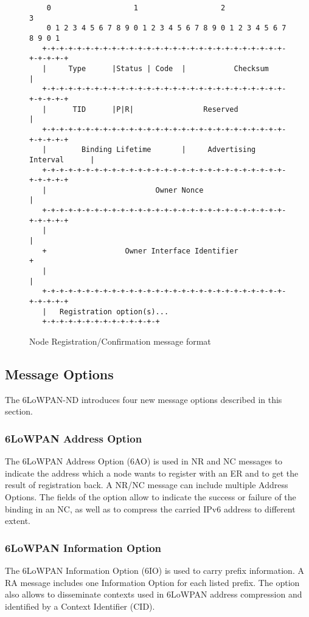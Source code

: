 \begin{figure}[htp]
\begin{mylisting}
\begin{verbatim}
    0                   1                   2                   3
    0 1 2 3 4 5 6 7 8 9 0 1 2 3 4 5 6 7 8 9 0 1 2 3 4 5 6 7 8 9 0 1
   +-+-+-+-+-+-+-+-+-+-+-+-+-+-+-+-+-+-+-+-+-+-+-+-+-+-+-+-+-+-+-+-+
   |     Type      |Status | Code  |           Checksum            |
   +-+-+-+-+-+-+-+-+-+-+-+-+-+-+-+-+-+-+-+-+-+-+-+-+-+-+-+-+-+-+-+-+
   |      TID      |P|R|                Reserved                   |
   +-+-+-+-+-+-+-+-+-+-+-+-+-+-+-+-+-+-+-+-+-+-+-+-+-+-+-+-+-+-+-+-+
   |        Binding Lifetime       |     Advertising Interval      |
   +-+-+-+-+-+-+-+-+-+-+-+-+-+-+-+-+-+-+-+-+-+-+-+-+-+-+-+-+-+-+-+-+
   |                         Owner Nonce                           |
   +-+-+-+-+-+-+-+-+-+-+-+-+-+-+-+-+-+-+-+-+-+-+-+-+-+-+-+-+-+-+-+-+
   |                                                               |
   +                  Owner Interface Identifier                   +
   |                                                               |
   +-+-+-+-+-+-+-+-+-+-+-+-+-+-+-+-+-+-+-+-+-+-+-+-+-+-+-+-+-+-+-+-+
   |   Registration option(s)...
   +-+-+-+-+-+-+-+-+-+-+-+-+-+
\end{verbatim}
\end{mylisting}
\caption{Node Registration/Confirmation message format}\label{fig:nr.nc.format}
\end{figure}

\subsection{Message Options}
The 6LoWPAN-ND introduces four new message options described in this section.

\subsubsection{6LoWPAN Address Option}\label{nd.option.address}
The 6LoWPAN Address Option (6AO) is used in NR and NC messages to indicate the address which a node wants to register with an ER and to get the result of registration back. A NR/NC message can include multiple Address Options. The fields of the option allow to indicate the success or failure of the binding in an NC, as well as to compress the carried IPv6 address to different extent. 

\subsubsection{6LoWPAN Information Option}\label{nd.option.info}
The 6LoWPAN Information Option (6IO) is used to carry prefix information. A RA message includes one Information Option for each listed prefix.  The option also allows to disseminate contexts used in 6LoWPAN address compression and identified by a Context Identifier (CID).

